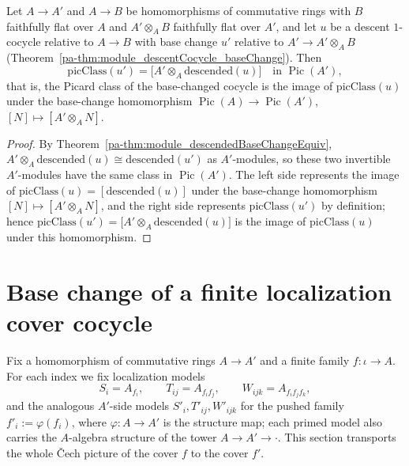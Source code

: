 \begin{theorem}
  \label{pa-thm:module_picClass_baseChange}
  \leanok

  Let \(A \to A'\) and \(A \to B\) be homomorphisms of commutative rings with \(B\) faithfully
  flat over \(A\) and \(A' \otimes_A B\) faithfully flat over \(A'\), and let \(u\) be a descent
  \(1\)-cocycle relative to \(A \to B\) with base change \(u'\) relative to \(A' \to A'
  \otimes_A B\) (Theorem~\ref{pa-thm:module_descentCocycle_baseChange}). Then
  \[
    \mathrm{picClass}(u') = \bigl[A' \otimes_A \mathrm{descended}(u)\bigr] \quad \text{in }
    \operatorname{Pic}(A'),
  \]
  that is, the Picard class of the base-changed cocycle is the image of \(\mathrm{picClass}(u)\)
  under the base-change homomorphism \(\operatorname{Pic}(A) \to \operatorname{Pic}(A')\),
  \([N] \mapsto [A' \otimes_A N]\).
\end{theorem}
\begin{proof}
  \leanok
  By Theorem~\ref{pa-thm:module_descendedBaseChangeEquiv}, \(A' \otimes_A \mathrm{descended}(u)
  \cong \mathrm{descended}(u')\) as \(A'\)-modules, so these two invertible \(A'\)-modules have
  the same class in \(\operatorname{Pic}(A')\). The left side represents the image of
  \(\mathrm{picClass}(u) = [\mathrm{descended}(u)]\) under the base-change homomorphism
  \([N] \mapsto [A' \otimes_A N]\), and the right side represents \(\mathrm{picClass}(u')\) by
  definition; hence \(\mathrm{picClass}(u') = \bigl[A' \otimes_A \mathrm{descended}(u)\bigr]\)
  is the image of \(\mathrm{picClass}(u)\) under this homomorphism.
\end{proof}

\section{Base change of a finite localization cover cocycle}
\label{pa-sec:awayCover_baseChange}

Fix a homomorphism of commutative rings \(A \to A'\) and a finite family \(f \colon \iota \to
A\).  For each index we fix localization models
\[
  S_i = A_{f_i}, \qquad T_{ij} = A_{f_i f_j}, \qquad W_{ijk} = A_{f_i f_j f_k},
\]
and the analogous \(A'\)-side models \(S'_i, T'_{ij}, W'_{ijk}\) for the pushed family
\(f'_i := \varphi(f_i)\), where \(\varphi \colon A \to A'\) is the structure map; each primed
model also carries the \(A\)-algebra structure of the tower \(A \to A' \to \cdot\).  This
section transports the whole \v Cech picture of the cover \(f\) to the cover \(f'\).

